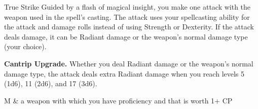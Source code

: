\begin{Spell}[
  level=Cantrip,
  time=1 Action,
  range=Self,
  components={S, M},
  duration=Instantaneous,
  school=Divination,
  attack=Melee,
  effect=Radiant
]{True Strike}
Guided by a flash of magical insight, you make one attack with the weapon used in the spell’s casting. The attack uses your spellcasting ability for the attack and damage rolls instead of using Strength or Dexterity. If the attack deals damage, it can be Radiant damage or the weapon’s normal damage type (your choice).

\textbf{Cantrip Upgrade.} Whether you deal Radiant damage or the weapon’s normal damage type, the attack deals extra Radiant damage when you reach levels 5 (1d6), 11 (2d6), and 17 (3d6).

\begin{components}
M & a weapon with which you have proficiency and that is worth 1+ CP
\end{components}
\end{Spell}



